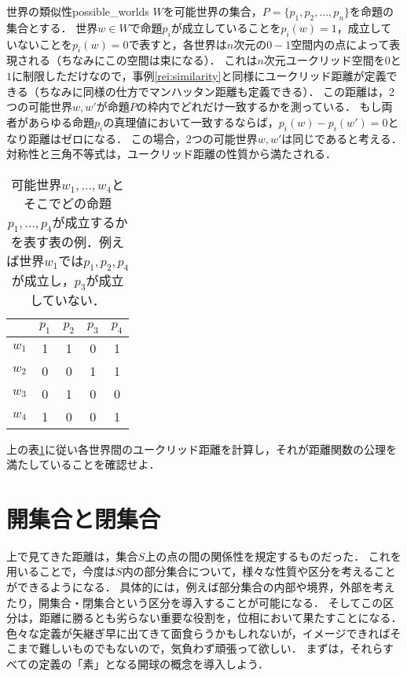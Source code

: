 \documentclass[11pt,a4paper, dvipdfmx]{jsarticle}
\begin{document}
\begin{rei}{世界の類似性}{possible_worlds}
$W$を可能世界の集合，$P = \{p_1, p_2, \dots, p_n\}$を命題の集合とする．
世界$w \in W$で命題$p_i$が成立していることを$p_i(w)=1$，成立していないことを$p_i(w)=0$で表すと，各世界は$n$次元の$0-1$空間内の点によって表現される（ちなみにこの空間は束になる）．
これは$n$次元ユークリッド空間を$0$と$1$に制限しただけなので，事例\ref{rei:similarity}と同様にユークリッド距離が定義できる（ちなみに同様の仕方でマンハッタン距離も定義できる）．
この距離は，2つの可能世界$w, w'$が命題$P$の枠内でどれだけ一致するかを測っている．
もし両者があらゆる命題$p_i$の真理値において一致するならば，$p_i(w) - p_i(w')=0$となり距離はゼロになる．
この場合，2つの可能世界$w, w'$は同じであると考える．
対称性と三角不等式は，ユークリッド距離の性質から満たされる．
\end{rei}
\begin{table}[htbp]
 \caption{可能世界$w_1, \dots, w_4$とそこでどの命題$p_1, \dots, p_4$が成立するかを表す表の例．例えば世界$w_1$では$p_1, p_2, p_4$が成立し，$p_3$が成立していない．}
 \centering
 \begin{tabular}[tb]{ccccc}
      & $p_1$ & $p_2$ & $p_3$ & $p_4$ \\ \hline
$w_1$ &  1  &  1  &  0  &  1  \\
$w_2$ &  0  &  0  &  1  &  1  \\
$w_3$ &  0  &  1  &  0  &  0  \\
$w_4$ &  1  &  0  &  0  &  1  
 \end{tabular}
 \label{tb:possible_worlds}
\end{table}

\begin{renshu}{}{}
 上の表\ref{tb:possible_worlds}に従い各世界間のユークリッド距離を計算し，それが距離関数の公理を満たしていることを確認せよ．
\end{renshu}

\section{開集合と閉集合}
上で見てきた距離は，集合$S$上の点の間の関係性を規定するものだった．
これを用いることで，今度は$S$内の部分集合について，様々な性質や区分を考えることができるようになる．
具体的には，例えば部分集合の内部や境界，外部を考えたり，開集合・閉集合という区分を導入することが可能になる．
そしてこの区分は，距離に勝るとも劣らない重要な役割を，位相において果たすことになる．
色々な定義が矢継ぎ早に出てきて面食らうかもしれないが，イメージできればそこまで難しいものでもないので，気負わず頑張って欲しい．
まずは，それらすべての定義の「素」となる開球の概念を導入しよう．
\end{document}
